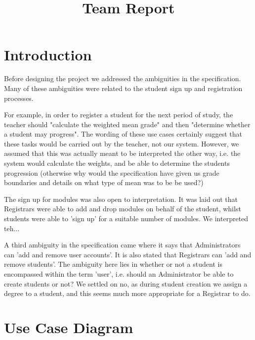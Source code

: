 \documentclass[12pt,a4paper,oneside,draft]{article}
\title{Team Report}
\date{} %
\begin{document}
\maketitle

\section{Introduction}
Before designing the project we addressed the ambiguities in the specification.
Many of these ambiguities were related to the student sign up and registration
processes.

For example, in order to register a student for the next period of study, the
teacher  should "calculate the weighted mean grade" and then "determine
whether a student may progress". The wording of these use cases certainly suggest that
these tasks would be carried out by the teacher, not our system. However, we assumed
that this was actually meant to be interpreted the other way, i.e. the system
would calculate the weights, and be able to determine the students progression
(otherwise why would the specification have given us grade boundaries and details on what
type of mean was to be be used?)

The sign up for modules was also open to interpretation. It was laid out that
Registrars were able to add and drop modules on behalf of the student, whilst
students were able to 'sign up' for a suitable number of modules. We interpreted
teh...

A third ambiguity in the specification came where it says that Administrators can
'add and remove user accounts'. It is also stated that Registrars can 'add and remove
students'. The ambiguity here lies in whether or not a student is encompassed within
 the term 'user', i.e. should an Administrator be able to create students or not? We
  settled on no, as during student creation we assign a degree to a student, and this
   seems much more appropriate for a Registrar to do.




\section{Use Case Diagram}
\end{document}
